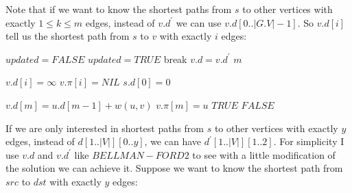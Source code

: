 \documentclass{book}
\begin{document}
	Note that if we want to know the shortest paths from $s$ to other vertices with exactly $1 \le k \le m$ edges, instead of $v.d^\prime$ we can use $v.d[0..|G.V| - 1]$. So $v.d[i]$ tell us the shortest path from $s$ to $v$ with exactly $i$ edges:
	\begin{algorithm*}[h!]
		\begin{algorithmic}[1]
				\State {}
				 
					\State $updated = FALSE$
							\State $updated = TRUE$
						\EndIf
					\EndFor
						\State break
					\EndIf
						\State $v.d = v.d^\prime$
					\EndFor
				\EndFor
				\State \Return $m$
			\EndFunction
		\end{algorithmic}
			\begin{algorithmic}[1]
							\State $v.d[i] = \infty$
							\State $v.\pi[i] = NIL$
						\EndFor
					\EndFor
					\State $s.d[0] = 0$
				\EndFunction
			\end{algorithmic}		
		
			\begin{algorithmic}[1]
						\State $v.d[m] = u.d[m - 1] + w(u, v)$
						\State $v.\pi[m] = u$
						\State \Return $TRUE$
					\Else
						\State \Return $FALSE$
					\EndIf
			\EndFunction
		\end{algorithmic}
	\end{algorithm*}
	\FloatBarrier
	If we are only interested in shortest paths from $s$ to other vertices with exactly $y$ edges, instead of $d[1..|V|][0..y]$, we can have $d^\prime[1..|V|][1..2]$. For simplicity I use $v.d$ and $v.d^\prime$ like $BELLMAN-FORD2$ to see with a little modification of the solution we can achieve it. Suppose we want to know the shortest path from $src$ to $dst$ with exactly $y$ edges:
	
\end{document}
